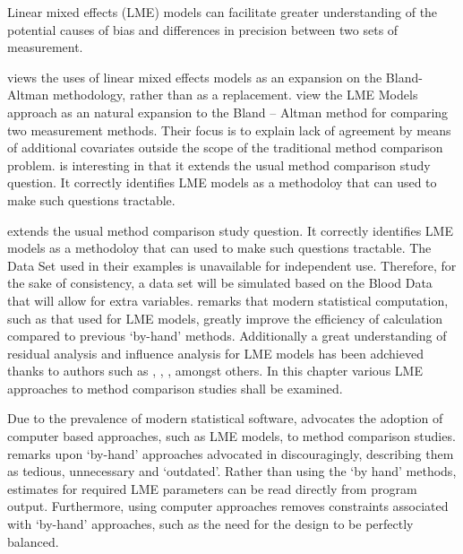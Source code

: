 \documentclass[12pt, a4paper]{report}
\theoremstyle{plain}
\theoremstyle{definition}
\theoremstyle{remark}
\begin{document}
		
		
		Linear mixed effects (LME) models can facilitate greater
		understanding of the potential causes of bias and differences in
		precision between two sets of measurement. 
	
		\citet{LaiShiao} views
		the uses of linear mixed effects models as an expansion on the
		Bland-Altman methodology, rather than as a replacement.\citet{LaiShiao} view the LME Models approach as an natural expansion to the Bland – Altman method for comparing two measurement methods. Their focus is to explain lack of agreement by means of additional covariates outside the scope of the traditional method comparison problem. \citet{LaiShiao} is interesting in that it extends the usual method comparison study question. It correctly identifies LME models as a methodoloy that can used to make such questions tractable.	
		
		\citet{LaiShiao} extends the usual method comparison study question. It correctly identifies LME models as a methodoloy that can used to make such questions tractable.
		The Data Set used in their examples is unavailable for independent use. Therefore, for the sake of consistency, a data set will be simulated based on the Blood Data that will allow for extra variables.
		\citet{BXC2008} remarks that modern statistical computation, such as that used for LME models, greatly improve the efficiency of
		calculation compared to previous `by-hand' methods. Additionally a great understanding of residual analysis and influence analysis for LME models has been adchieved thanks to authors such as \citet{schab}, \citet{CPJ}, \citet{cook86} \citet{west}, amongst others. In this chapter various LME approaches to method comparison studies shall
		be examined. 
		
		Due to the prevalence of modern statistical software, \citet{BXC2008} advocates the adoption of computer based approaches, such as LME models, to method comparison studies. \citet{BXC2008} remarks upon `by-hand' approaches advocated in \citet{BA99} discouragingly, describing them as tedious, unnecessary and `outdated'. Rather than using the `by hand' methods, estimates for required LME parameters can be read directly from program output. Furthermore, using computer approaches removes constraints associated with `by-hand' approaches, such as the need for the design to be perfectly balanced.
		
\end{document}
